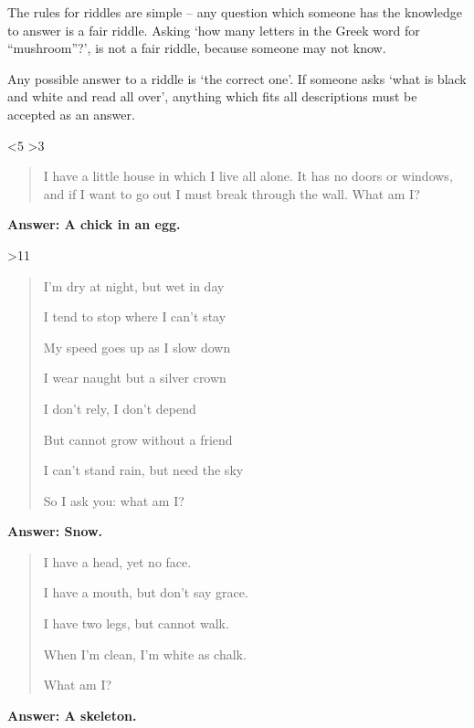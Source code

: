 \begin{multicols}{2}

The rules for riddles are simple -- any question which someone has the knowledge to answer is a fair riddle.
Asking `how many letters in the Greek word for ``mushroom''?', is not a fair riddle, because someone may not know.

Any possible answer to a riddle is `the correct one'.
If someone asks `what is black and white and read all over', anything which fits all descriptions must be accepted as an answer.

\ifnum\month<5
	\ifnum\month>3
		\begin{quotation}
		
		I have a little house in which I live all alone.
		It has no doors or windows, and if I want to go out I must break through the wall.
		What am I?
		\end{quotation}
	
		\textbf{Answer: A chick in an egg.}
	\fi

\fi

\ifnum\month>11

	\begin{quotation}

	I'm dry at night, but wet in day

	I tend to stop where I can't stay

	My speed goes up as I slow down

	I wear naught but a silver crown

	I don't rely, I don't depend

	But cannot grow without a friend

	I can't stand rain, but need the sky

	So I ask you: what am I?

	\end{quotation}

	\textbf{Answer: Snow.}

\fi


\ifnum{}
	\begin{quotation}
		I have a head, yet no face.

		I have a mouth, but don't say grace.

		I have two legs, but cannot walk.

		When I'm clean, I'm white as chalk.

		What am I?
	\end{quotation}

	\textbf{Answer: A skeleton.}
\fi


\end{multicols}
